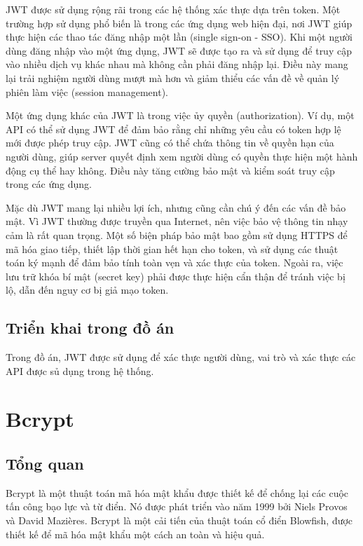 \documentclass[../DoAn.tex]{subfiles}
\begin{document}
JWT được sử dụng rộng rãi trong các hệ thống xác thực dựa trên token. Một trường hợp sử dụng phổ biến là trong các ứng dụng web hiện đại, nơi JWT giúp thực hiện các thao tác đăng nhập một lần (single sign-on - SSO). Khi một người dùng đăng nhập vào một ứng dụng, JWT sẽ được tạo ra và sử dụng để truy cập vào nhiều dịch vụ khác nhau mà không cần phải đăng nhập lại. Điều này mang lại trải nghiệm người dùng mượt mà hơn và giảm thiểu các vấn đề về quản lý phiên làm việc (session management).

Một ứng dụng khác của JWT là trong việc ủy quyền (authorization). Ví dụ, một API có thể sử dụng JWT để đảm bảo rằng chỉ những yêu cầu có token hợp lệ mới được phép truy cập. JWT cũng có thể chứa thông tin về quyền hạn của người dùng, giúp server quyết định xem người dùng có quyền thực hiện một hành động cụ thể hay không. Điều này tăng cường bảo mật và kiểm soát truy cập trong các ứng dụng.

Mặc dù JWT mang lại nhiều lợi ích, nhưng cũng cần chú ý đến các vấn đề bảo mật. Vì JWT thường được truyền qua Internet, nên việc bảo vệ thông tin nhạy cảm là rất quan trọng. Một số biện pháp bảo mật bao gồm sử dụng HTTPS để mã hóa giao tiếp, thiết lập thời gian hết hạn cho token, và sử dụng các thuật toán ký mạnh để đảm bảo tính toàn vẹn và xác thực của token. Ngoài ra, việc lưu trữ khóa bí mật (secret key) phải được thực hiện cẩn thận để tránh việc bị lộ, dẫn đến nguy cơ bị giả mạo token.

\subsection{Triển khai trong đồ án}
\label{subsection:3.5.2}
Trong đồ án, JWT được sử dụng để xác thực người dùng, vai trò và xác thực các API được sủ dụng trong hệ thống.

\section{Bcrypt}
\label{section:3.6}
\subsection{Tổng quan}
\label{subsection:3.6.1}
Bcrypt là một thuật toán mã hóa mật khẩu được thiết kế để chống lại các cuộc tấn công bạo lực và từ điển. Nó được phát triển vào năm 1999 bởi Niels Provos và David Mazières. Bcrypt là một cải tiến của thuật toán cổ điển Blowfish, được thiết kế để mã hóa mật khẩu một cách an toàn và hiệu quả.
\end{document}
